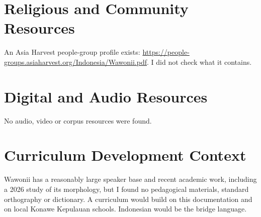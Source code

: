 \documentclass[12pt]{article}
\begin{document}
\section{Religious and Community Resources}
An Asia Harvest people-group profile exists: \url{https://people-groups.asiaharvest.org/Indonesia/Wawonii.pdf}. I did not check what it contains.

\section{Digital and Audio Resources}
No audio, video or corpus resources were found.

\section{Curriculum Development Context}
Wawonii has a reasonably large speaker base and recent academic work, including a 2026 study of its morphology, but I found no pedagogical materials, standard orthography or dictionary. A curriculum would build on this documentation and on local Konawe Kepulauan schools. Indonesian would be the bridge language.
\end{document}
